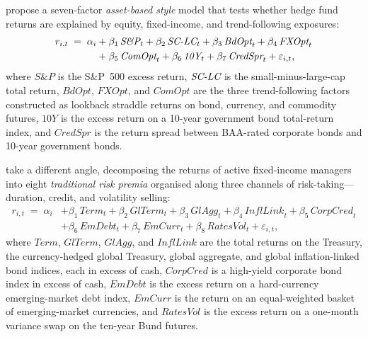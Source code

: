 \citet{fung2004hedge} propose a seven-factor \emph{asset-based style}
model that tests whether hedge fund returns are explained by equity,
fixed-income, and trend-following exposures:
\begin{equation}\label{eq:funghsieh}
\begin{split}
  r_{i,t} \;=\; \alpha_i
  &+ \beta_1\,\textit{S\&P}_t + \beta_2\,\textit{SC\text{-}LC}_t
   + \beta_3\,\textit{BdOpt}_t + \beta_4\,\textit{FXOpt}_t \\
  &+ \beta_5\,\textit{ComOpt}_t
   + \beta_6\,\textit{10Y}_t
   + \beta_7\,\textit{CredSpr}_t + \varepsilon_{i,t},
\end{split}
\end{equation}
where $\textit{S\&P}$ is the S\&P~500 excess return,
$\textit{SC\text{-}LC}$ is the small-minus-large-cap total return,
$\textit{BdOpt}$, $\textit{FXOpt}$, and $\textit{ComOpt}$ are the
three trend-following factors constructed as lookback straddle returns
on bond, currency, and commodity futures, $\textit{10Y}$ is the excess
return on a 10-year government bond total-return index, and
$\textit{CredSpr}$ is the return spread between BAA-rated corporate
bonds and 10-year government bonds.

\citet{brooks2020active} take a different angle, decomposing the
returns of active fixed-income managers into eight \emph{traditional
risk premia} organised along three channels of risk-taking---duration,
credit, and volatility selling:
\begin{equation}\label{eq:brooks}
\begin{split}
  r_{i,t} \;=\; \alpha_i
  &+ \beta_1\,\textit{Term}_t + \beta_2\,\textit{GlTerm}_t
   + \beta_3\,\textit{GlAgg}_t + \beta_4\,\textit{InflLink}_t 
   + \beta_5\,\textit{CorpCred}_t \\
  &+ \beta_6\,\textit{EmDebt}_t + \beta_7\,\textit{EmCurr}_t 
  + \beta_8\,\textit{RatesVol}_t + \varepsilon_{i,t},
\end{split}
\end{equation}
where $\textit{Term}$, $\textit{GlTerm}$, $\textit{GlAgg}$, and
$\textit{InflLink}$ are the total returns on the Treasury, the
currency-hedged global Treasury, global aggregate, and global
inflation-linked bond indices, each in excess of cash,
$\textit{CorpCred}$ is a high-yield corporate bond index in excess of
cash, $\textit{EmDebt}$ is the excess return on a hard-currency
emerging-market debt index, $\textit{EmCurr}$ is the return on an
equal-weighted basket of emerging-market currencies, and
$\textit{RatesVol}$ is the excess return on a one-month variance swap
on the ten-year Bund futures.

